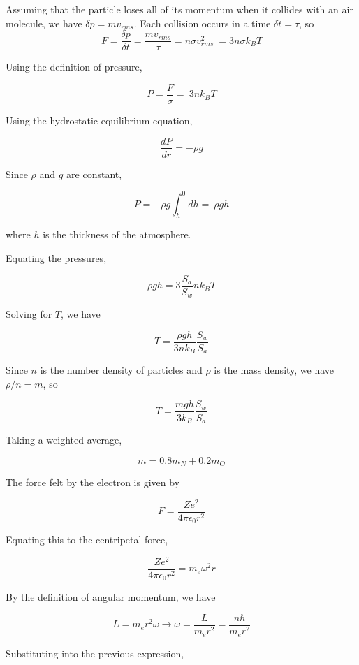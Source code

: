 \documentclass[11pt]{article}
\begin{document}
\begin{pproblem}
\begin{pssolution*}{}{}
\begin{alternativas}
    \item Assuming that the particle loses all of its momentum when it collides with an air molecule, we have \(\delta p = mv_{rms}\). Each collision occurs in a time \(\delta t =\tau\), so
    \[F = \frac{\delta p }{\delta t} = \frac{mv_{rms}}{\tau} = n\sigma v_{rms}^2 \  \boxed{ = 3n\sigma k_BT}\]

    \item Using the definition of pressure,
    
    \[P = \frac{F}{\sigma} = \ \boxed{3nk_B T} \]

    \item Using the hydrostatic-equilibrium equation,
    
    \[\frac{dP}{dr} = -\rho g\]

    Since \(\rho\) and \(g\) are constant,

    \[P = -\rho g \int_h^0dh= \ \boxed{\rho g h}\]

    where \(h\) is the thickness of the atmosphere.

    \item Equating the pressures,

    \[\rho g h = 3\frac{S_a}{S_w}nk_BT\]

    Solving for \(T\), we have

    \[T = \frac{\rho g h}{3nk_B}\frac{S_w}{S_a}\]

    Since \(n\) is the number density of particles and \(\rho\) is the mass density, we have \(\rho/n = m\), so

    \[\boxed{T= \frac{m g h}{3k_B}\frac{S_w}{S_a}}\]

    \item Taking a weighted average,
    
    \[\boxed{m = 0.8 m_N + 0.2 m_O}\]

    \item The force felt by the electron is given by
    
    \[F = \frac{Ze^2}{4\pi \epsilon_0r^2}\]

    Equating this to the centripetal force,

    \[\frac{Ze^2}{4\pi \epsilon_0r^2} = m_e \omega^2 r\]

    By the definition of angular momentum, we have

    \[L = m_er^2\omega \rightarrow \omega = \frac{L}{m_er^2} = \frac{n\hbar}{m_er^2}\]

    Substituting into the previous expression,


\end{alternativas}
\end{pssolution*}
\end{pproblem}
\end{document}

